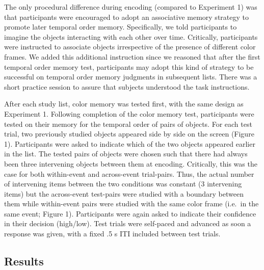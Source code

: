 The only procedural difference during encoding (compared to Experiment
1) was that participants were encouraged to adopt an associative memory
strategy to promote later temporal order memory. Specifically, we told
participants to imagine the objects interacting with each other over
time. Critically, participants were instructed to associate objects
irrespective of the presence of different color frames. We added this
additional instruction since we reasoned that after the first temporal
order memory test, participants may adopt this kind of strategy to be
successful on temporal order memory judgments in subsequent lists. There
was a short practice session to assure that subjects understood the task
instructions.

After each study list, color memory was tested first, with the same
design as Experiment 1. Following completion of the color memory test,
participants were tested on their memory for the temporal order of pairs
of objects. For each test trial, two previously studied objects appeared
side by side on the screen (Figure 1). Participants were asked to
indicate which of the two objects appeared earlier in the list. The
tested pairs of objects were chosen such that there had always been
three intervening objects between them at encoding. Critically, this was
the case for both within-event and across-event trial-pairs. Thus, the
actual number of intervening items between the two conditions was
constant (3 intervening items) but the across-event test-pairs were
studied with a boundary between them while within-event pairs were
studied with the same color frame (i.e.~in the same event; Figure 1).
Participants were again asked to indicate their confidence in their
decision (high/low). Test trials were self-paced and advanced as soon a
response was given, with a fixed .5 s ITI included between test trials.

\subsection{Results}\label{results-1}

